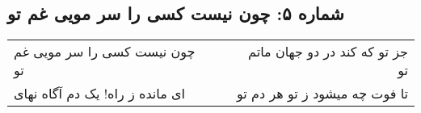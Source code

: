 \begin{center}
\section*{شماره ۵: چون نیست کسی را سر مویی غم تو}
\label{sec:005}
\begin{longtable}{l p{0.5cm} r}
چون نیست کسی را سر مویی غم تو
&&
جز تو که کند در دو جهان ماتم تو
\\
ای مانده ز راه! یک دم آگاه نهای
&&
تا فوت چه میشود ز تو هر دم تو
\\
\end{longtable}
\end{center}
